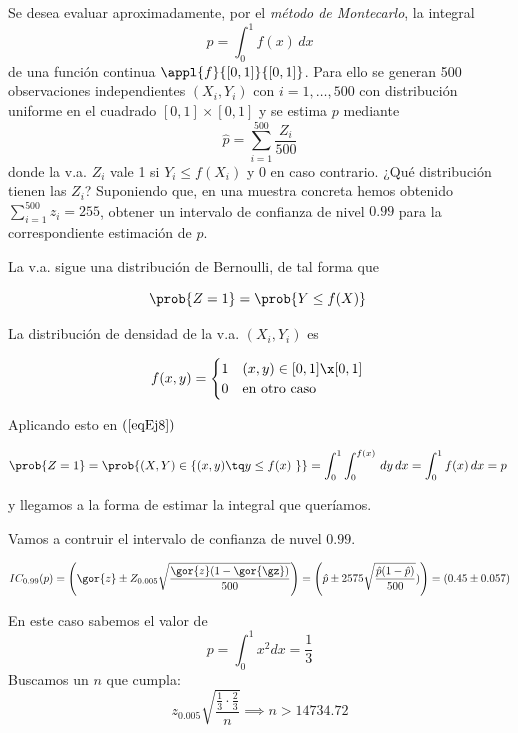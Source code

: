 \begin{problem}[8]\nopagebreak[3]
\ppart Se desea evaluar aproximadamente, por el \textit{método de Montecarlo}, la integral 
\[ p = \int_0^1f(x)\,dx \] 
de una función continua $\appl{f}{[0,1]}{[0,1]}$. Para ello se generan 500 observaciones independientes $(X_i,Y_i)$ con $i=1,\dotsc,500$ con distribución uniforme en el cuadrado $[0,1]×[0,1]$ y se estima $p$ mediante
\[ \hat{p} = \sum_{i=1}^{500} \frac{Z_i}{500} \]
donde la v.a. $Z_i$ vale 1 si $Y_i \leq f(X_i)$ y $0$ en caso contrario. ¿Qué distribución tienen las $Z_i$? Suponiendo que, en una muestra concreta hemos obtenido $\sum_{i=1}^{500} z_i = 255$, obtener un intervalo de confianza de nivel $0.99$ para la correspondiente estimación de $p$.

\solution
\pagebreak
\spart La v.a. sigue una distribución de Bernoulli, de tal forma que

\begin{equation} \prob{Z=1}=\prob{Y \leq f(X)} \label{eqEj8} \end{equation}

La distribución de densidad de la v.a. $(X_i, Y_i)$ es 

\[
f(x,y) = \begin{cases}
1 & (x,y) \in [0,1] \x [0,1] \\
0 & \text{en otro caso}
\end{cases}
\]

Aplicando esto en $(\ref{eqEj8})$

\[ \prob{Z=1} = \prob{(X,Y) \in \{(x,y)\tq y \leq f(x) \}} = \int_0^1\int_0^{f(x)} \,dy\,dx = \int_0^1f(x)\,dx = p \]

y llegamos a la forma de estimar la integral que queríamos. 

Vamos a contruir el intervalo de confianza de nuvel $0.99$.

\[IC_{0.99} (p) = \left(\gor{z} \pm Z_{0.005}\sqrt{\frac{\gor{z}(1-\gor{\gz})}{500}}\right) = \left(\hat{p} \pm 2575 \sqrt{\frac{\hat{p}(1-\hat{p})}{500}}) \right) = (0.45\pm 0.057)\]


\spart En este caso sabemos el valor de \[p = \int_0^1 x^2dx = \frac{1}{3}\]
Buscamos un $n$ que cumpla: \[z_{0.005} \sqrt{\frac{\frac{1}{3}\cdot\frac{2}{3}}{n}} \implies n > 14734.72\]

\end{problem}


